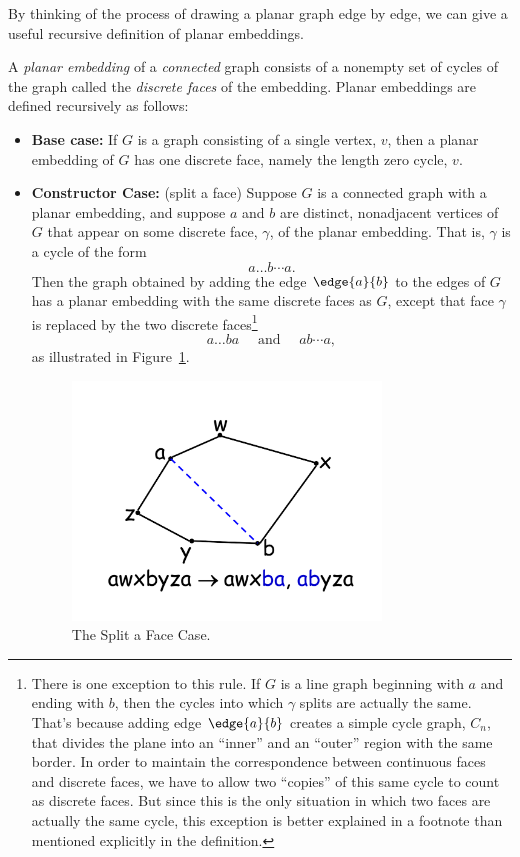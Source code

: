 By thinking of the process of drawing a planar graph edge by edge, we can
give a useful recursive definition of planar embeddings.

\begin{definition}
A \emph{planar embedding} of a \emph{connected} graph consists of a
nonempty set of cycles of the graph called the \emph{discrete faces} of
the embedding.  Planar embeddings are defined recursively as follows:

\begin{itemize}
\item \textbf{Base case:} If $G$ is a graph consisting of a single vertex,
$v$, then a planar embedding of $G$ has one discrete face, namely the
length zero cycle, $v$.

\item \textbf{Constructor Case:} (split a face) Suppose $G$ is a
connected graph with a planar embedding, and suppose $a$ and $b$ are
distinct, nonadjacent vertices of $G$ that appear on some discrete face,
$\gamma$, of the planar embedding.  That is, $\gamma$ is a cycle of the form
\[
a \dots b \cdots a.
\]
Then the graph obtained by adding the edge $\edge{a}{b}$ to the edges of
$G$ has a planar embedding with the same discrete faces as $G$, except
that face $\gamma$ is replaced by the two discrete
faces\footnote{\label{C} There is one exception to this rule.  If $G$ is a
line graph beginning with $a$ and ending with $b$, then the cycles into
which $\gamma$ splits are actually the same.  That's because adding edge
$\edge{a}{b}$ creates a simple cycle graph, $C_n$, that divides the plane
into an ``inner'' and an ``outer'' region with the same border.  In order
to maintain the correspondence between continuous faces and discrete
faces, we have to allow two ``copies'' of this same cycle to count as
discrete faces.  But since this is the only situation in which two faces
are actually the same cycle, this exception is better explained in a
footnote than mentioned explicitly in the definition.}
\[
a\dots ba\quad \text{ and } \quad ab\cdots a, 
\]
as illustrated in Figure~\ref{fig:face-splitting}.

\begin{figure}[h]
\centering \includegraphics[height=2.5in]{figures/split-a-face}
\caption{The Split a Face Case.}
\label{fig:face-splitting}
\end{figure}


\end{itemize}
\end{definition}
